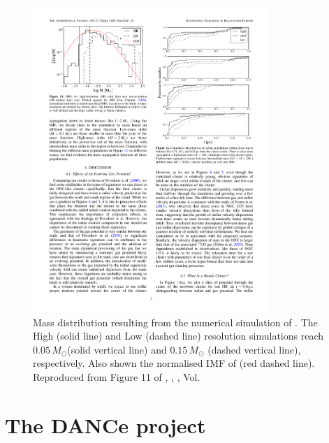 \begin{figure}[ht!]
\begin{center}
\includegraphics[width=0.8\textwidth]{background/Figures/F11_Kuznetsova2015.pdf}
\caption{Mass distribution resulting from the numerical simulation of \citet{2015ApJ...815...27K}. The High (solid line) and Low (dashed line) resolution simulations reach $0.05\, M_{\odot}$(solid vertical line) and $0.15\, M_{\odot}$ (dashed vertical line), respectively. Also shown the normalised IMF of \citet{Chabrier2005} (red dashed line). Reproduced from Figure 11 of \citet{2015ApJ...815...27K}, \textit{}, , Vol. }
\label{fig:IMFKuznetsova}
\end{center}
\end{figure}

\section{The DANCe project}
\label{sect:DANCeproject}

